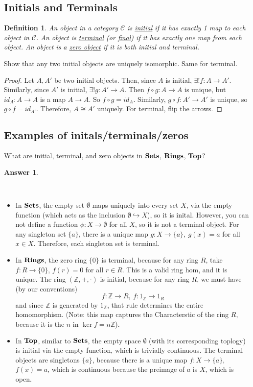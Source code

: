 \documentclass[hidelinks,12pt]{article}
\newcommand{\ul}{\underline}
\newtheorem{defintion}{Definition}
\newtheorem*{answer}{Answer}
\newcommand{\Z}{\mathbb{Z}}
\newcommand{\catname}[1]{{\normalfont\mathbf{#1}}}
\begin{document}
\subsection{Initials and Terminals}\begin{defintion}
    An object in a category \(\mathcal{C}\) is \ul{initial} if it has exactly 1 map to each object in \(\mathcal{C}\). An object is \ul{terminal} (or \ul{final}) if it has exactly one map \emph{from} each object. An object is a \ul{zero object} if it is both initial and terminal.
\end{defintion}  
Show that any two initial objects are uniquely isomorphic. Same for terminal.
\begin{proof}
    Let \(A,A'\) be two initial objects. Then, since \(A\) is initial, \(\exists!f:A\to A'\). Similarly, since \(A'\) is initial, \(\exists!g:A'\to A\). Then \(f\circ g:A\to A\) is unique, but \(id_{A}:A\to A\) is a map \(A\to A\). So \(f\circ g=id_{A}\). Similarly, \(g\circ f:A'\to A'\) is unique, so \(g\circ f=id_{A'}\). Therefore, \(A\cong A'\) uniquely. For terminal, flip the arrows.
\end{proof}
\subsection{Examples of initals/terminals/zeros} What are initial, terminal, and zero objects in \(\catname{Sets}\), \(\catname{Rings}\), \(\catname{Top}\)?
\begin{answer}
\end{answer}
\ \begin{itemize}
    \item In \(\catname{Sets}\), the empty set \(\emptyset\) maps uniquely into every set \(X\), via the empty function (which acts as the inclusion \(\emptyset\hookrightarrow X\)), so it is inital. However, you can not define a function \(\phi:X\to\emptyset\) for all \(X\), so it is not a terminal object. For any singleton set \(\{a\}\), there is a unique map \(g:X\to\{a\},\ g(x)=a\) for all \(x\in X\). Therefore, each singleton set is terminal.
    \item In \(\catname{Rings}\), the zero ring \(\{0\}\) is terminal, because for any ring \(R\), take \(f:R\to\{0\}\), \(f(r)=0\) for all \(r\in R\). This is a valid ring hom, and it is unique. The ring \((\Z,+,\cdot)\) is initial, because for any ring \(R\), we must have (by our conventions) \[
            f:\Z\to R,\ f:1_{\Z}\mapsto 1_{R}
        \] and since \(\Z\) is generated by \(1_{\Z}\), that rule determines the entire homomorphism. (Note: this map captures the Characterstic of the ring \(R\), because it is the \(n\) in \(\ker{f}=n\Z\)).
    \item In \(\catname{Top}\), similar to \(\catname{Sets}\), the empty space \(\emptyset\) (with its corresponding toplogy) is initial via the empty function, which is trivially continuous. The terminal objects are singletons \(\{a\}\), because there is a unique map \(f:X\to\{a\}\), \(f(x)=a\), which is continuous because the preimage of \(a\) is \(X\), which is open.
\end{itemize}
\end{document}
